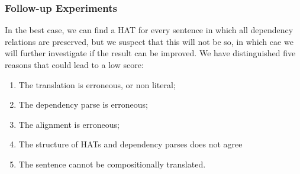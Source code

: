 \documentclass{report}
\theoremstyle{definition}
\theoremstyle{plain}
\begin{document}
\subsubsection{Follow-up Experiments}

In the best case, we can find a HAT for every sentence in which all dependency relations are preserved, but we suspect that this will not be so, in which cae we will further investigate if the result can be improved. We have distinguished five reasons that could lead to a low score:

\begin{enumerate}
\item The translation is erroneous, or non literal;
\item The dependency parse is erroneous;
\item The alignment is erroneous;
\item The structure of HATs and dependency parses does not agree
\item The sentence cannot be compositionally translated.
\end{enumerate}
\end{document}
